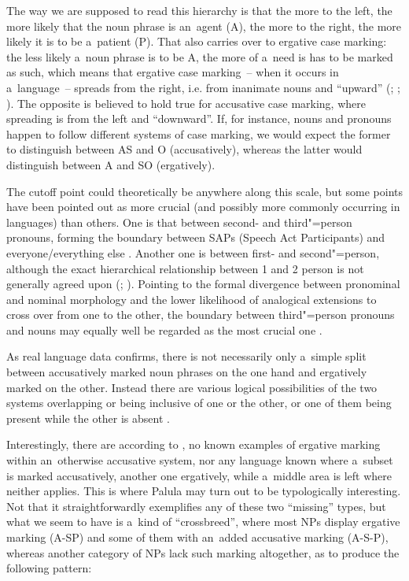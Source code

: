 The way we are supposed to read this hierarchy is that the more to the left, the more likely that the noun phrase is an~agent (A), the more to the right, the more likely it is to be a~patient (P). That also carries over to ergative case marking: the less likely a~noun phrase is to be A, the more of a~need is has to be marked as such, which means that ergative case marking~-- when it occurs in a~language~-- spreads from the right, i.e. from inanimate nouns and ``upward'' (\citealt[645]{delancey1981}; \citealt[84]{dixon1994}; \citealt[262]{garrett1990}). The opposite is believed to hold true for accusative case marking, where spreading is from the left and ``downward''. If, for instance, nouns and pronouns happen to follow different systems of case marking, we would expect the former to distinguish between AS and O (accusatively), whereas the latter would distinguish between A and SO (ergatively). 



The cutoff point could theoretically be anywhere along this scale, but some points have been pointed out as more crucial (and possibly more commonly occurring in languages) than others. One is that between second- and third"=person pronouns, forming the boundary between SAPs (Speech Act Participants) and everyone/everything else \citep[644]{delancey1981}. Another one is between first- and second"=person, although the exact hierarchical relationship between 1 and 2 person is not generally agreed upon (\citealt[644]{delancey1981}; \citealt[88--90]{dixon1994}). Pointing to the formal divergence between pronominal and nominal morphology and the lower likelihood of analogical extensions to cross over from one to the other, the boundary between third"=person pronouns and nouns may equally well be regarded as the most crucial one \citep[286]{garrett1990}. 



As real language data confirms, there is not necessarily only a~simple split between accusatively marked noun phrases on the one hand and ergatively marked on the other. Instead there are various logical possibilities of the two systems overlapping or being inclusive of one or the other, or one of them being present while the other is absent \citep[109]{dixon1994}.



Interestingly, there are according to \citeauthor{dixon1994}, no known examples of ergative marking within an~otherwise accusative system, nor any language known where a~subset is marked accusatively, another one ergatively, while a~middle area is left where neither applies. This is where Palula may turn out to be typologically interesting. Not that it straightforwardly exemplifies any of these two ``missing'' types, but what we seem to have is a~kind of ``crossbreed'', where most NPs display ergative marking (A-SP) and some of them with an~added accusative marking (A-S-P), whereas another category of NPs lack such marking altogether, as to produce the following pattern:


